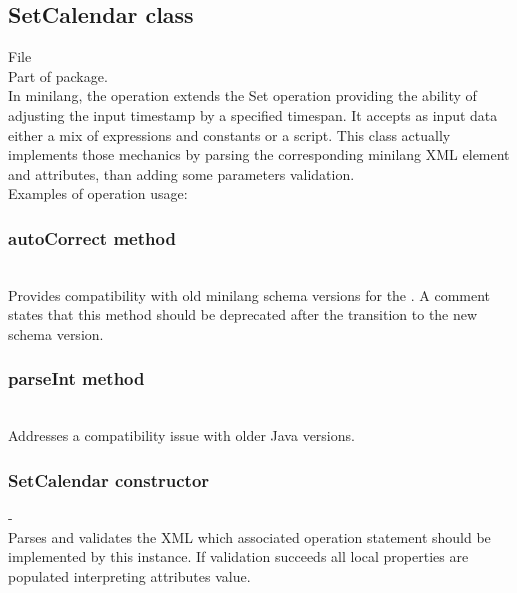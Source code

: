 \subsection{SetCalendar class}
File \\
Part of  package.\\
\newline
In minilang, the  operation extends the Set operation providing the ability of adjusting the input timestamp by a specified timespan. It accepts as input data either a mix of expressions and constants or a script. This class actually implements those mechanics by parsing the corresponding  minilang XML element and attributes, than adding some parameters validation.\\
Examples of  operation usage:\\

\subsubsection{autoCorrect method}
\\

Provides compatibility with old minilang schema versions for the . A comment states that this method should be deprecated after the transition to the new schema version.

\subsubsection{parseInt method}
\\

Addresses a compatibility issue with older Java versions.

\subsubsection{SetCalendar constructor}
-\\

Parses and validates the XML  which associated operation statement should be implemented by this instance. If validation succeeds all local properties are populated interpreting attributes value.

